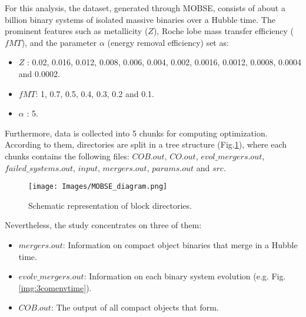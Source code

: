 \documentclass[preprint,12pt]{elsarticle}
\begin{document}
For this analysis, the dataset, generated through MOBSE, consists of about a billion binary systems of isolated massive binaries over a Hubble time. The prominent features such as metallicity ($Z$), Roche lobe mass transfer efficiency ($fMT$), and the parameter $\alpha$ (energy removal efficiency) set as:

\begin{itemize}
    \item $Z$ : 0.02, 0.016, 0.012, 0.008, 0.006, 0.004, 0.002, 0.0016, 0.0012, 0.0008, 0.0004 and 0.0002.
    \item $fMT$: 1, 0.7, 0.5, 0.4, 0.3, 0.2 and 0.1.
    \item $\alpha$ : 5.
\end{itemize}
Furthermore, data is collected into 5 chunks for computing optimization. According to them, directories are split in a tree structure (Fig.\ref{img:Mobsediagram}), where
each chunks contains the following files: $COB.out$, $CO.out$, $evol\_mergers.out$, $failed\_systems.out$, $input$, $mergers.out$, $params.out$ and $src$. 

\begin{figure}[htp]
\centering
\texttt{[image: Images/MOBSE\_diagram.png]}
\caption[Methods]{Schematic representation of block directories.}
\label{img:Mobsediagram}
\end{figure}

Nevertheless, the study concentrates on three of them:

\begin{itemize}
    \item $mergers.out$: Information on compact object binaries that merge in a Hubble time.
    \item $evolv\_mergers.out$: Information on each binary system evolution (e.g. Fig.\ref{img:3comenvtime}).
    \item $COB.out$: The output of all compact objects that form.
\end{itemize}
\end{document}
